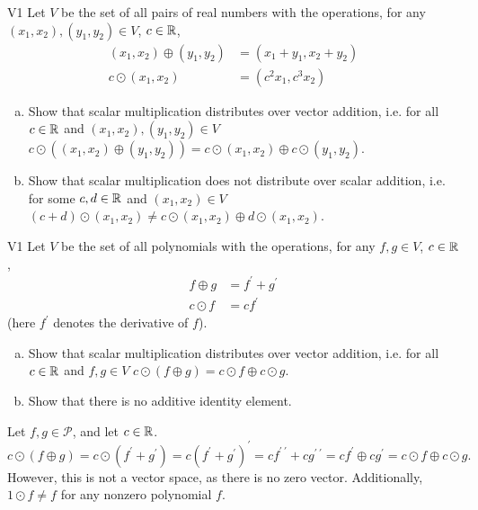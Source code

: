 \begin{problem}{V1}
Let $V$ be the set of all pairs of real numbers with the operations, for any \((x_1,x_2), (y_1,y_2) \in V\), $c \in \mathbb{R}$,
\begin{align*}
(x_1,x_2) \oplus (y_1,y_2) &= (x_1+y_1,x_2+y_2) \\
c \odot (x_1,x_2) &= (c^2x_1, c^3x_2)
\end{align*}
\begin{enumerate}[(a)]
\item Show that scalar multiplication distributes over
      vector addition, i.e. for all \(c \in \mathbb{R}\) and \( (x_1,x_2), (y_1,y_2) \in V\)
      \(c\odot((x_1,x_2) \oplus (y_1,y_2))=
      c\odot(x_1,x_2) \oplus c\odot(y_1,y_2)\).
\item Show that scalar multiplication does not distribute over
      scalar addition, i.e. for some \(c,d \in \mathbb{R}\) and \( (x_1,x_2)\in V\)
      \((c+d)\odot(x_1,x_2)\neq c\odot(x_1,x_2) \oplus d\odot(x_1,x_2)\).
\end{enumerate}
\end{problem}
\begin{solution}

\end{solution}


\begin{problem}{V1}
Let $V$ be the set of all polynomials with the operations, for any $f, g \in V$, $c \in \mathbb{R}$,
\begin{align*}
f \oplus g &= f^\prime + g^\prime \\
c \odot f &= c f^\prime
\end{align*}
(here $f^\prime$ denotes the derivative of $f$).
\begin{enumerate}[(a)]
\item Show that scalar multiplication distributes over
      vector addition, i.e. for all $c \in \mathbb{R}$ and $f,g \in V$
      \(c\odot(f \oplus g)=
      c\odot f \oplus c\odot g\).
\item  Show that there is no additive identity element.
\end{enumerate}
\end{problem}
\begin{solution}
Let $f,g \in \mathcal{P}$, and let $c \in \mathbb{R}$.
$$c \odot (f \oplus g) = c \odot (f^\prime+g^\prime) =
c(f^\prime+g^\prime)^\prime = cf^{\prime\ \prime}+cg^{\prime\ \prime} =
cf^\prime\oplus cg^\prime= c \odot f \oplus c \odot g.$$
However, this is not a vector space, as there is no zero vector.  Additionally, $1 \odot f \neq f$ for any nonzero polynomial $f$.
\end{solution}


